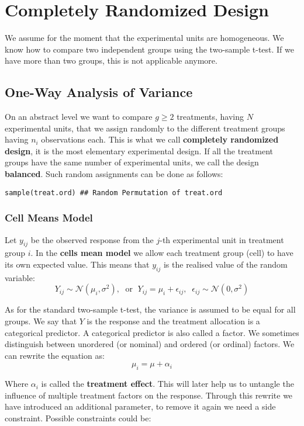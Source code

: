 \section{Completely Randomized Design}

We assume for the moment that the experimental units are homogeneous. We know how to compare two independent groups using the two-sample t-test. If we have more than two groups, this is not applicable anymore.


\subsection{One-Way Analysis of Variance}

On an abstract level we want to compare $g \geq 2$ treatments, having $N$ experimental units, that we assign randomly to the different treatment groups having $n_i$ observations each. This is what we call \textbf{completely randomized design}, it is the most elementary experimental design. If all the treatment groups have the same number of experimental units, we call the design \textbf{balanced}. Such random assignments can be done as follows:

\begin{lstlisting}
sample(treat.ord) ## Random Permutation of treat.ord
\end{lstlisting}

\subsubsection{Cell Means Model}

Let $y_{ij}$ be the observed response from the $j$-th experimental unit in treatment group $i$. In the \textbf{cells mean model} we allow each treatment group (cell) to have its own expected value. This means that $y_{ij}$ is the realised value of the random variable:
$$Y_{ij} \sim \mathcal N(\mu_i, \sigma^2), \; \text{ or } \; Y_{ij} = \mu_i + \epsilon_{ij}, \;\; \epsilon_{ij} \sim \mathcal N(0, \sigma^2)$$

As for the standard two-sample t-test, the variance is assumed to be equal for all groups. We say that $Y$ is the response and the treatment allocation is a categorical predictor. A categorical predictor is also called a factor. We sometimes distinguish between unordered (or nominal) and ordered (or ordinal) factors. We can rewrite the equation as:
$$\mu_i = \mu + \alpha_i$$

Where $\alpha_i$ is called the \textbf{treatment effect}. This will later help us to untangle the influence of multiple treatment factors on the response. Through this rewrite we have introduced an additional parameter, to remove it again we need a side constraint. Possible constraints could be:


